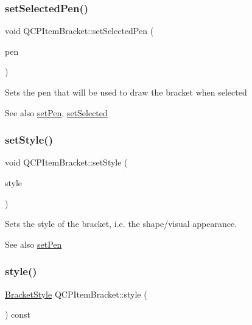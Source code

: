 \subsubsection{\texorpdfstring{set\+Selected\+Pen()}{setSelectedPen()}}
{\footnotesize\ttfamily void Q\+C\+P\+Item\+Bracket\+::set\+Selected\+Pen (\begin{DoxyParamCaption}\item[{const Q\+Pen \&}]{pen }\end{DoxyParamCaption})}

Sets the pen that will be used to draw the bracket when selected

\begin{DoxySeeAlso}{See also}
\hyperlink{class_q_c_p_item_bracket_ab13001d9cc5d8f9e56ea15bdda682acb}{set\+Pen}, \hyperlink{class_q_c_p_abstract_item_a203de94ad586cc44d16c9565f49d3378}{set\+Selected} 
\end{DoxySeeAlso}
\mbox{\label{class_q_c_p_item_bracket_a612dffa2373422eef8754d690add3703}} 
\subsubsection{\texorpdfstring{set\+Style()}{setStyle()}}
{\footnotesize\ttfamily void Q\+C\+P\+Item\+Bracket\+::set\+Style (\begin{DoxyParamCaption}\item[{\hyperlink{class_q_c_p_item_bracket_a7ac3afd0b24a607054e7212047d59dbd}{Q\+C\+P\+Item\+Bracket\+::\+Bracket\+Style}}]{style }\end{DoxyParamCaption})}

Sets the style of the bracket, i.\+e. the shape/visual appearance.

\begin{DoxySeeAlso}{See also}
\hyperlink{class_q_c_p_item_bracket_ab13001d9cc5d8f9e56ea15bdda682acb}{set\+Pen} 
\end{DoxySeeAlso}
\mbox{\label{class_q_c_p_item_bracket_a600ad8c0a3193cc2f335db6039f2932d}} 
\subsubsection{\texorpdfstring{style()}{style()}}
{\footnotesize\ttfamily \hyperlink{class_q_c_p_item_bracket_a7ac3afd0b24a607054e7212047d59dbd}{Bracket\+Style} Q\+C\+P\+Item\+Bracket\+::style (\begin{DoxyParamCaption}{ }\end{DoxyParamCaption}) const\hspace{0.3cm}{\ttfamily [inline]}}



